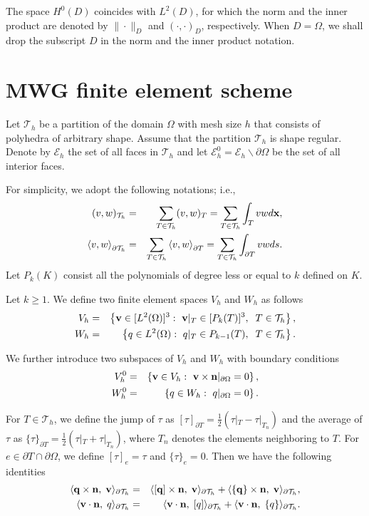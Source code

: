 \documentclass[11pt]{amsart}
\newcommand{\bq}{\begin{equation}}
\newcommand{\bx}{{\bf x}}
\newcommand{\bv}{{\bf v}}
\def\T{{\mathcal T}}
\def\pT{{\partial T}}
\def\l{{\langle}}
\def\r{{\rangle}}
\def\bn{{\bf n}}
\def\bq{{\bf q}}
\def\cal#1{\mathcal{#1}}
\begin{document}
The space $H^0(D)$ coincides with $L^2(D)$, for which the norm and
the inner product are denoted by $\|\cdot \|_{D}$ and
$(\cdot,\cdot)_{D}$, respectively. When $D=\Omega$, we shall drop
the subscript $D$ in the norm and the inner product notation.

 

\section{MWG finite element scheme}\label{Section:WGFEM}

Let ${\cal T}_h$ be a partition of the domain $\Omega$ with mesh
size $h$ that consists of polyhedra of arbitrary shape. Assume that
the partition ${\cal T}_h$ is shape regular. Denote by ${\cal E}_h$ the set of all
faces in ${\cal T}_h$ and let ${\cal E}_h^0={\cal E}_h\backslash\partial\Omega$ be the set of all interior faces.

For simplicity, we adopt the following notations; i.e.,
\begin{eqnarray*}
(v,w)_{\T_h} &=& \sum_{T\in\T_h}(v,w)_T=\sum_{T\in\T_h}\int_T vw d\bx,\\
 \l v,w\r_{\partial\T_h}&=&\sum_{T\in\T_h} \l v,w\r_\pT=\sum_{T\in\T_h} \int_\pT vw ds.
\end{eqnarray*}
Let $P_k(K)$ consist all the polynomials of degree less or equal to $k$ defined on $K$.

Let $k\ge 1$. We define two finite element spaces $V_h$ and $W_h$ as follows
\begin{eqnarray*}
V_h &=&\left\{ \bv\in [L^2(\Omega)]^3:\ \bv|_{T}\in [P_{k}(T)]^3,\;\; T\in\T_h\right\},\\
W_h &=&\left\{ q\in L^2(\Omega):\ q|_{T}\in P_{k-1}(T),\;\; T\in\T_h\right\}.
\end{eqnarray*}

We further introduce two subspaces of $V_h$ and $W_h$ with boundary conditions
\begin{eqnarray*}
V_h^0 &=&\left\{ \bv\in V_h:\ \bv\times\bn|_{\partial\Omega}=0\right\},\\
W_h^0 &=&\left\{ q\in W_h:\ q|_{\partial\Omega}=0 \right\}.
\end{eqnarray*}


For $T\in\T_h$, we define the jump of $\tau$ as $[\tau]_\pT=\frac12(\tau|_T-\tau|_{T_n})$ and the average of $\tau$ as $\{\tau\}_\pT=\frac12(\tau|_T+\tau|_{T_n})$, where $T_n$ denotes the elements neighboring to $T$.  For $e\in\pT\cap\partial\Omega$, we define $[\tau]_e=\tau$ and $\{\tau\}_e=0$. Then we have the following identities
\begin{eqnarray}
\langle \bq\times\bn,\; \bv\rangle_{\partial\T_h}&=&\langle [\bq]\times\bn,\;\bv\rangle_{\partial\T_h}
+\langle \{\bq\}\times\bn,\;\bv\rangle_{\partial\T_h},\label{key0}\\
\langle \bv\cdot\bn,\; q\rangle_{\partial\T_h}&=&\langle \bv\cdot\bn,\; [q]\rangle_{\partial\T_h}
+\langle \bv\cdot\bn,\;\{q\}\rangle_{\partial\T_h}.\label{key00}
\end{eqnarray}
\end{document}
